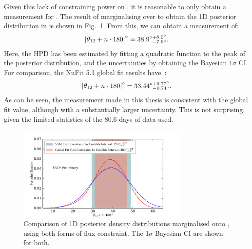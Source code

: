 Given this lack of constraining power on \dmsq{}, it is reasonable to only obtain a measurement for \tonetwo{}. The result of marginalising over \dmsq{} to obtain the 1D posterior distribution in \tonetwo{} is shown in Fig.~\ref{fig:1d_theta_12_posterior}. From this, we can obtain a measurement of:
\begin{equation*}
    \left|\theta_{12}{} + n\cdot180\right|^{\circ} = 38.9^{\circ+8.0^{\circ}}_{\phantom{\circ}-7.9^{\circ}}.
\end{equation*}
Here, the HPD has been estimated by fitting a quadratic function to the peak of the posterior distribution, and the uncertainties by obtaining the Bayesian $1\sigma$ CI. For comparison, the NuFit 5.1 global fit results have~\cite{estebanFateHintsUpdated2020}: %
\begin{equation*}
    \left|\theta_{12}{} + n\cdot180\right|^{\circ} = 33.44^{\circ+0.77^{\circ}}_{\phantom{\circ}-0.74^{\circ}}.
\end{equation*}
As can be seen, the measurement made in this thesis is consistent with the global fit value, although with a substantially larger uncertainty. This is not surprising, given the limited statistics of the 80.6 days of data used.

\begin{figure}
    \centering
    \includegraphics[width=0.75\textwidth]{6_SolarAnalysis/images/theta_12_comparison_flux_constraint_corrected_tagging_2_mobins.pdf}
    \caption[Comparison of 1D posterior density distribution marginalised onto \tonetwo{} for different flux constraints]
    {Comparison of 1D posterior density distributions marginalised onto \tonetwo{}, using both forms of \beight{} flux constraint. The 1$\sigma$ Bayesian CI are shown for both.}
    \label{fig:1d_theta_12_posterior}
\end{figure}

